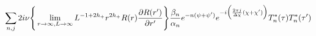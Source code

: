\begin{equation}
\sum_{n,j}
2 i \nu \Bigg\{ \lim_{r \rightarrow \infty,  L \rightarrow \infty} L^{-1+2h_+} r^{2h_{+}} R(r) \frac{\partial R(r')}{\partial r'} \Bigg\}
\frac{\beta_n}{\alpha_n} e^{-n(\psi + \psi')}e^{-i\Bigl({\frac{2\pi j} {\Delta \chi}}(\chi+\chi')\Bigr)}T^*_n(\tau)T^*_n(\tau')
\end{equation}


